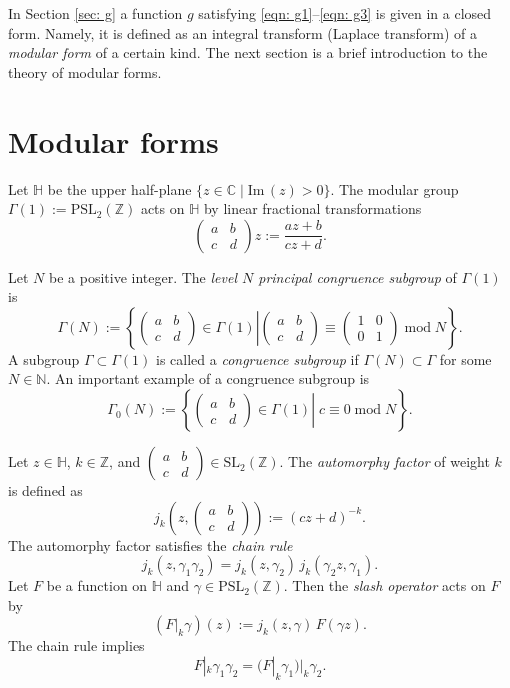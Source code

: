 \documentclass{scrartcl}
\renewcommand{\Im}{\mathrm{Im}\,}
\newcommand{\N}{\mathbb{N}}
\newcommand{\Z}{\mathbb{Z}}
\newcommand{\C}{\mathbb{C}}
\newcommand{\h}{\mathbb{H}}
\begin{document}
In Section \ref{sec: g} a function $g$ satisfying \eqref{eqn: g1}--\eqref{eqn: g3} is given in a closed form. Namely, it is defined as an integral transform (Laplace transform) of a \emph{modular form} of a certain kind. The next section is a brief introduction to the theory of modular forms.


\section{Modular forms}
Let $\h$ be the upper half-plane $\{z\in\C\mid\Im(z)>0\}$. The modular group $\Gamma(1):=\mathrm{PSL}_2(\Z)$ acts on $\h$ by linear fractional transformations
$$\left(\begin{smallmatrix}a&b\\c&d\end{smallmatrix}\right)z:=\frac{az+b}{cz+d}.$$

Let $N$ be a positive integer. The \emph{level $N$ principal congruence subgroup} of $\Gamma(1)$ is
$$\Gamma(N):=\left\{\left.\left(\begin{smallmatrix}a&b\\c&d\end{smallmatrix}\right)\in\Gamma(1)\right|\left(\begin{smallmatrix}a&b\\c&d\end{smallmatrix}\right)\equiv\left(\begin{smallmatrix}1&0\\0&1\end{smallmatrix}\right)\;\mathrm{mod}\;N\right\}.$$
A subgroup $\Gamma\subset\Gamma(1)$ is called a \emph{congruence subgroup} if $\Gamma(N)\subset\Gamma$ for some $N\in\N$. An important example of a congruence subgroup is
$$\Gamma_0(N):=\left\{\left.\left(\begin{smallmatrix}a&b\\c&d\end{smallmatrix}\right)\in\Gamma(1)\right|\;c\equiv0\;\mathrm{mod}\;N\right\}.$$

Let $z\in\h$, $k\in\Z$, and $\left(\begin{smallmatrix}a&b\\c&d\end{smallmatrix}\right)\in\mathrm{SL}_2(\Z)$. The \emph{automorphy factor} of weight $k$ is defined as
$$j_k(z,\left(\begin{smallmatrix}a&b\\c&d\end{smallmatrix}\right)):=(cz+d)^{-k}.$$
The automorphy factor satisfies the \emph{chain rule}
$$j_k(z,\gamma_1\gamma_2)=j_k(z,\gamma_2)\,j_k(\gamma_2z,\gamma_1). $$
Let $F$ be a  function on $\h$ and $\gamma\in\mathrm{PSL}_2(\Z)$. Then the \emph{slash operator} acts on $F$ by
$$(F|_k\gamma)(z):=j_k(z,\gamma)\,F(\gamma z). $$
The chain rule implies
$$F|_k\gamma_1\gamma_2=(F|_k\gamma_1)|_k\gamma_2.$$
\end{document}

